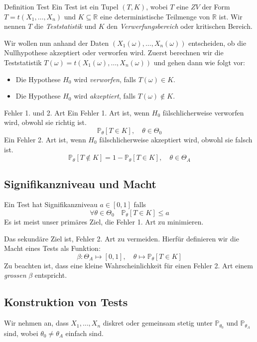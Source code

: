 \documentclass[a4paper,10pt]{article}
\def\R{\mathbb{R}}
\def\P{\mathbb{P}}
\begin{document}
\begin{mainbox}{Definition Test}
	Ein Test ist ein Tupel \((T,K)\), wobei \(T\) eine \(ZV\) der Form \(T=t(X_1, \ldots, X_n)\) und \(K \subseteq \R\) eine deterministische Teilmenge von \(\R\) ist. Wir nennen \(T\) die \textit{Teststatistik} und \(K\) den \textit{Verwerfungsbereich} oder kritischen Bereich.
\end{mainbox}

Wir wollen nun anhand der Daten \((X_1(\omega), \ldots, X_n(\omega))\) entscheiden, ob die Nullhypothese akzeptiert oder verworfen wird. Zuerst berechnen wir die Teststatistik \(T(\omega) = t(X_1(\omega), \ldots, X_n(\omega))\) und gehen dann wie folgt vor:
\begin{itemize}
	\item Die Hypothese \(H_0\) wird \textit{verworfen}, falls \(T(\omega) \in K\).
	\item Die Hypothese \(H_0\) wird \textit{akzeptiert}, falls \(T(\omega) \notin K\).
\end{itemize}
\begin{subbox}{Fehler 1. und 2. Art}
	Ein Fehler 1. Art ist, wenn \(H_0\) fälschlicherweise verworfen wird, obwohl sie richtig ist.
	\[\P_\theta[T \in K], \quad \theta \in \Theta_0\]
	\noindent Ein Fehler 2. Art ist, wenn \(H_0\) fälschlicherweise akzeptiert wird, obwohl sie falsch ist.
	\[\P_\theta[T\notin K] = 1 - \P_\theta[T \in K], \quad \theta \in \Theta_A\]
\end{subbox}
\subsection{Signifikanzniveau und Macht}
Ein Test hat Signifikanzniveau \(a \in [0,1]\) falls
\[\forall \theta \in \Theta_0 \quad \P_\theta[T \in K] \le a\]
Es ist meist unser primäres Ziel, die Fehler 1. Art zu minimieren.

Das sekundäre Ziel ist, Fehler 2. Art zu vermeiden. Hierfür definieren wir die Macht eines Tests als Funktion:
\[\beta : \Theta_A \mapsto [0,1], \quad \theta \mapsto \P_\theta[T \in K]\]
Zu beachten ist, dass eine kleine Wahrscheinlichkeit für einen Fehler 2. Art einem \textit{grossen} \(\beta\) entspricht.

\subsection{Konstruktion von Tests}
Wir nehmen an, dass \(X_1, \ldots, X_n\) diskret oder gemeinsam stetig unter \(\P_{\theta_0}\) und \(\P_{\theta_A}\) sind, wobei \(\theta_0 \ne \theta_A\) einfach sind.
\end{document}
